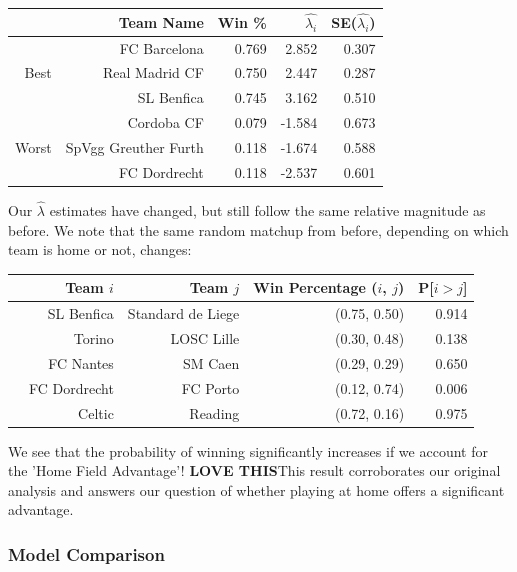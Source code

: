 \documentclass{article}
\begin{document}
\begin{table}[H]
\centering
\begin{tabular}{|r|rrrr|}
  \hline
 & Team Name & Win \% & $\hat{\lambda_i}$ & SE($\hat{\lambda_i}$) \\ 
  \hline
   &  FC Barcelona & 0.769 & 2.852 & 0.307 \\ 
 Best  &  Real Madrid CF & 0.750 & 2.447 & 0.287 \\ 
   &  SL Benfica & 0.745 & 3.162 & 0.510 \\ \cline{1-5}
   &  Cordoba CF & 0.079 & -1.584 & 0.673 \\ 
Worst   &  SpVgg Greuther Furth & 0.118 & -1.674  & 0.588 \\ 
   & FC Dordrecht & 0.118 & -2.537 & 0.601 \\
   \hline
\end{tabular}
\end{table}

Our $\hat{\lambda}$ estimates have changed, but still follow the same relative magnitude as before. We note that the same random matchup from before, depending on which team is home or not, changes:

\begin{table}[H]
\centering
\begin{tabular}{rrrrr}
  \hline
 & Team $i$ & Team $j$ & Win Percentage ($i$, $j$) & P[$i > j$] \\ 
  \hline
 & SL Benfica  & Standard de Liege & (0.75, 0.50) & 0.914 \\ 
   & Torino & LOSC Lille & (0.30, 0.48) & 0.138 \\ 
   & FC Nantes & SM Caen & (0.29, 0.29)  & 0.650 \\ 
   & FC Dordrecht & FC Porto & (0.12, 0.74) & 0.006 \\ 
   & Celtic & Reading & (0.72, 0.16) & 0.975 \\ 
   \hline
\end{tabular}
\end{table}

We see that the probability of winning significantly increases if we account for the 'Home Field Advantage'! \textbf{LOVE THIS}This result corroborates our original analysis and answers our question of whether playing at home offers a significant advantage.\\

\subsubsection{Model Comparison}
\end{document}
